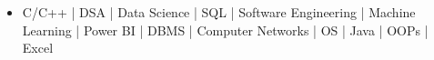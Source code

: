 \begin{itemize}
\item C/C++ | DSA | Data Science | \smallskip SQL | Software Engineering | Machine Learning | \smallskip Power BI | DBMS | Computer Networks |  OS | \smallskip Java | OOPs | Excel
\end{itemize}

















